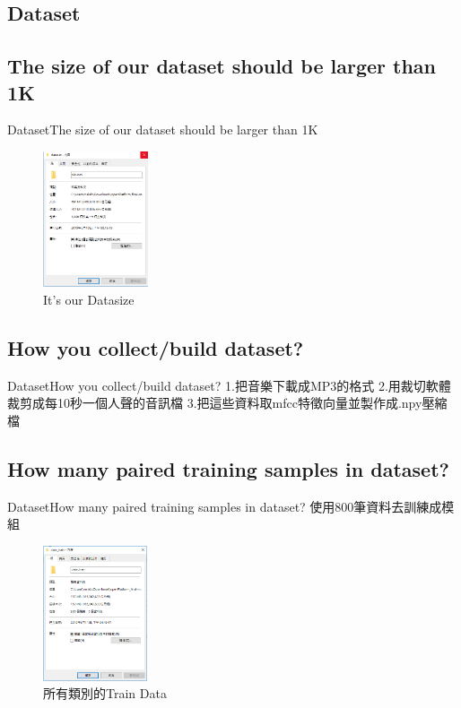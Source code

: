 \documentclass{beamer}
\begin{document}
\begin{CJK}{UTF8}{nkai}
\section{ Dataset}
\subsection { The size of our dataset should be larger than 1K}
\begin{frame}{Dataset}{The size of our dataset should be larger than 1K}
\begin{figure}
\begin{center} 
\includegraphics[height=4cm]{1.png}
\end{center}
\caption{It's our Datasize} 
\end{figure}
\end{frame}
\subsection{How you collect/build  dataset?}
\begin{frame}{Dataset}{How you collect/build  dataset?}
1.把音樂下載成MP3的格式
\newline
\newline
\newline
2.用裁切軟體裁剪成每10秒一個人聲的音訊檔
\newline
\newline
\newline
3.把這些資料取mfcc特徵向量並製作成.npy壓縮檔
\end{frame}
\subsection{How many paired training samples in dataset?}
\begin{frame}{Dataset}{How many paired training samples in  dataset?}
 使用800筆資料去訓練成模組
\newline
\newline
\begin{figure}
\begin{center} 
\includegraphics[height=4cm]{2.png}
\end{center}
\caption{所有類別的Train Data}
\end{figure}
\end{frame}

\end{CJK}
\end{document}
